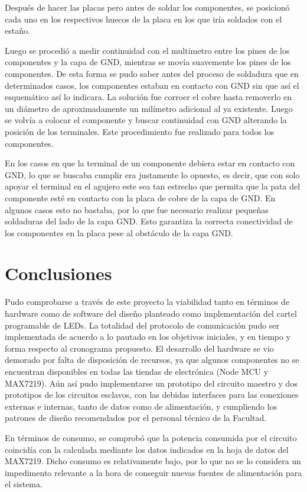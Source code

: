 Después de hacer las placas pero antes de soldar los componentes, se posicionó cada uno en los respectivos huecos de la placa en los que iría soldados con el estaño.

Luego se procedió a medir continuidad con el multímetro entre los pines de los componentes y la capa de GND, mientras se movía suavemente los pines de los componentes. De esta forma se pudo saber antes del proceso de soldadura que en determinados casos, los componentes estaban en contacto con GND sin que así el esquemático así lo indicara. La solución fue corroer el cobre hasta removerlo en un diámetro de aproximadamente un milímetro adicional al ya existente. Luego se volvía a colocar el componente y buscar continuidad con GND alterando la posición de los terminales. Este procedimiento fue realizado para todos los componentes.

En los casos en que la terminal de un componente debiera estar en contacto con GND, lo que se buscaba cumplir era justamente lo opuesto, es decir, que con solo apoyar el terminal en el agujero este sea tan estrecho que permita que la pata del componente esté en contacto con la placa de cobre de la capa de GND. En algunos casos esto no bastaba, por lo que fue necesario realizar pequeñas soldaduras del lado de la capa GND. Esto garantiza la correcta conectividad de los componentes en la placa pese al obstáculo de la capa GND.


\section{Conclusiones}

Pudo comprobarse a través de este proyecto la viabilidad tanto en términos de hardware como de software del diseño planteado como implementación del cartel programable de LEDs. 
La totalidad del protocolo de comunicación pudo ser implementada de acuerdo a lo pautado en los objetivos iniciales, y en tiempo y forma respecto al cronograma propuesto. El desarrollo del hardware se vio demorado por falta de disposición de recursos, ya que algunos componentes no se encuentran disponibles en todas las tiendas de electrónica (Node MCU y MAX7219). Aún así pudo implementarse un prototipo del circuito maestro y dos prototipos de los circuitos esclavos, con las debidas interfaces para las conexiones externas e internas, tanto de datos como de alimentación, y cumpliendo los patrones de diseño recomendados por el personal técnico de la Facultad.

En términos de consumo, se comprobó que la potencia consumida por el circuito coincidía con la calculada mediante los datos indicados en la hoja de datos del MAX7219. Dicho consumo es relativamente bajo, por lo que no se lo considera un impedimento relevante a la hora de conseguir nuevas fuentes de alimentación para el sistema. 

